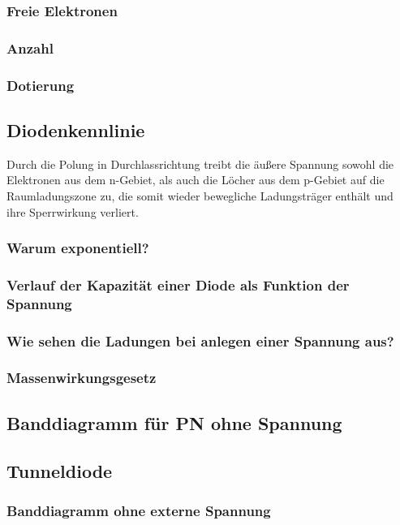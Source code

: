 \documentclass{article}
\begin{document}
	\subsubsection{Freie Elektronen}
	
	\subsubsection{Anzahl}
	\subsubsection{Dotierung}
	

	
\subsection{Diodenkennlinie }\label{k5:diode}
Durch die Polung in Durchlassrichtung treibt die äußere Spannung sowohl die Elektronen aus dem n-Gebiet, als auch die Löcher aus dem p-Gebiet auf die Raumladungszone zu, die somit wieder bewegliche Ladungsträger enthält und ihre Sperrwirkung verliert.  
    \subsubsection{Warum exponentiell?}
    \subsubsection{Verlauf der Kapazit\"at einer Diode als Funktion der Spannung}
    \subsubsection{Wie sehen die Ladungen bei anlegen einer Spannung aus?}
    \subsubsection{Massenwirkungsgesetz}

\subsection{Banddiagramm für PN ohne Spannung }\label{k5:pnBand}

\subsection{Tunneldiode }\label{k5:tunnelDiode}
    \subsubsection{Banddiagramm ohne externe Spannung}
\end{document}
